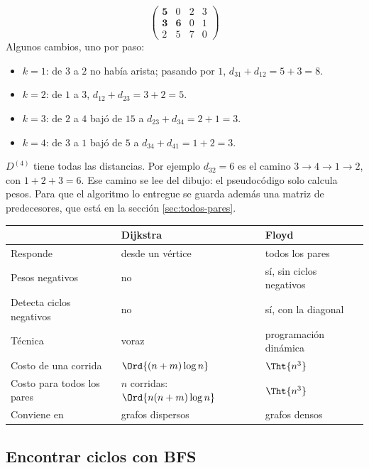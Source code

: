 \documentclass[11pt,letterpaper]{article}
\begin{document}
\begin{ejemplo}
\[\begin{pmatrix}
      \mathbf{5} & 0 & 2 & 3 \\
      \mathbf{3} & \mathbf{6} & 0 & 1 \\
      2 & 5 & 7 & 0
    \end{pmatrix}
  \]
  Algunos cambios, uno por paso:
  \begin{itemize}[itemsep=0.1em]
    \item $k = 1$: de $3$ a $2$ no había arista; pasando por $1$,
          $d_{31} + d_{12} = 5 + 3 = 8$.
    \item $k = 2$: de $1$ a $3$, $d_{12} + d_{23} = 3 + 2 = 5$.
    \item $k = 3$: de $2$ a $4$ bajó de $15$ a $d_{23} + d_{34} =
          2 + 1 = 3$.
    \item $k = 4$: de $3$ a $1$ bajó de $5$ a $d_{34} + d_{41} =
          1 + 2 = 3$.
  \end{itemize}
  $D^{(4)}$ tiene todas las distancias. Por ejemplo
  $d_{32} = 6$ es el camino $3 \to 4 \to 1 \to 2$, con
  $1 + 2 + 3 = 6$. Ese camino se lee del dibujo: el pseudocódigo solo
  calcula pesos. Para que el algoritmo lo entregue se guarda además
  una matriz de predecesores, que está en la sección
  \ref{sec:todos-pares}.
\end{ejemplo}

\begin{center}
\small
\begin{tabular}{lll}
  \toprule
  & \textbf{Dijkstra} & \textbf{Floyd} \\
  \midrule
  Responde & desde un vértice & todos los pares \\
  Pesos negativos & no & sí, sin ciclos negativos \\
  Detecta ciclos negativos & no & sí, con la diagonal \\
  Técnica & voraz & programación dinámica \\
  Costo de una corrida & $\Ord{(n + m)\log n}$ & $\Tht{n^3}$ \\
  Costo para todos los pares & $n$ corridas:
    $\Ord{n (n + m)\log n}$ & $\Tht{n^3}$ \\
  Conviene en & grafos dispersos & grafos densos \\
  \bottomrule
\end{tabular}
\end{center}


\subsection*{Encontrar ciclos con BFS}
\end{document}
